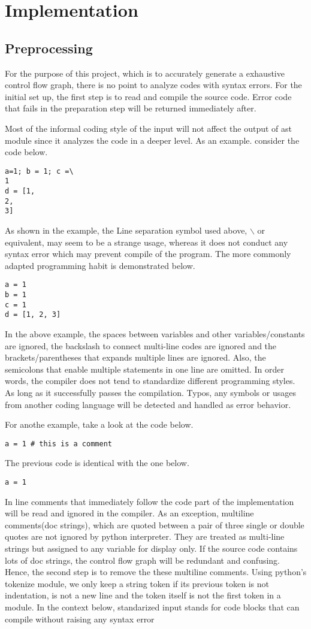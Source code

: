 \documentclass[11pt]{article}
\begin{document}
\section{Implementation}\label{section-implementation}
\subsection{Preprocessing}
For the purpose of this project, which is to accurately generate a exhaustive control flow graph, there is no point to analyze codes with syntax errors. For the initial set up, the first step is to read and compile the source code. Error code that fails in the preparation step will be returned immediately after.

Most of the informal coding style of the input will not affect the output of ast module since it analyzes the code in a deeper level. As an example. consider the code below.
\begin{lstlisting}
a=1; b = 1; c =\
1
d = [1,
2,
3]
\end{lstlisting}
As shown in the example, the Line separation symbol used above, $\backslash$ or equivalent, may seem to be a strange usage, whereas it does not conduct any syntax error which may prevent compile of the program. The more commonly adapted programming habit is demonstrated below.
\begin{lstlisting}
a = 1
b = 1
c = 1
d = [1, 2, 3]
\end{lstlisting}
In the above example, the spaces between variables and other variables/constants are ignored, the backslash to connect multi-line codes are ignored and the brackets/parentheses that expands multiple lines are ignored. Also, the semicolons that enable multiple statements in one line are omitted. In order words, the compiler does not tend to standardize different programming styles. As long as it successfully passes the compilation. Typos, any symbols or usages from another coding language will be detected and handled as error behavior.

For anothe example, take a look at the code below.
\begin{lstlisting}
a = 1 # this is a comment
\end{lstlisting}
The previous code is identical with the one below.
\begin{lstlisting}
a = 1
\end{lstlisting}

In line comments that immediately follow the code part of the implementation will be read and ignored in the compiler. As an exception, multiline comments(doc strings), which are quoted between a pair of three single or double quotes are not ignored by python interpreter. They are treated as multi-line strings but assigned to any variable for display only. If the source code contains lots of doc strings, the control flow graph will be redundant and confusing. \\
Hence, the second step is to remove the these multiline comments. Using python's tokenize module, we only keep a string token if its previous token is not indentation, is not a new line and the token itself is not the first token in a module. In the context below, standarized input stands for code blocks that can compile without raising any syntax error
\end{document}
